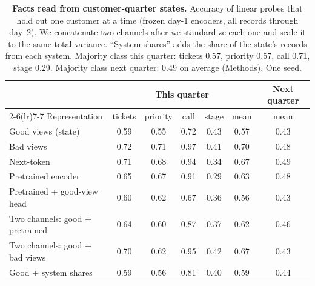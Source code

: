 \documentclass[11pt]{article}
\begin{document}
\begin{table}[h]
\centering
\small
\caption{\textbf{Facts read from customer-quarter states.} Accuracy of linear probes that hold out one customer at a time (frozen day-1 encoders, all records through day~2). We concatenate two channels after we standardize each one and scale it to the same total variance. ``System shares'' adds the share of the state's records from each system. Majority class this quarter: tickets 0.57, priority 0.57, call 0.71, stage 0.29. Majority class next quarter: 0.49 on average (Methods). One seed.}
\label{tab:twochannel}
\setlength{\tabcolsep}{4pt}\begin{tabular}{lcccccc}
\toprule
& \multicolumn{5}{c}{This quarter} & Next quarter \\
\cmidrule(lr){2-6}\cmidrule(lr){7-7}
Representation & tickets & priority & call & stage & mean & mean \\
\midrule
Good views (state) & 0.59 & 0.55 & 0.72 & 0.43 & 0.57 & 0.43 \\
Bad views & 0.72 & 0.71 & 0.97 & 0.41 & 0.70 & 0.48 \\
Next-token & 0.71 & 0.68 & 0.94 & 0.34 & 0.67 & 0.49 \\
Pretrained encoder & 0.65 & 0.67 & 0.91 & 0.29 & 0.63 & 0.48 \\
Pretrained + good-view head & 0.60 & 0.62 & 0.67 & 0.36 & 0.56 & 0.43 \\
Two channels: good + pretrained & 0.64 & 0.60 & 0.87 & 0.37 & 0.62 & 0.46 \\
Two channels: good + bad views & 0.70 & 0.62 & 0.95 & 0.42 & 0.67 & 0.43 \\
Good + system shares & 0.59 & 0.56 & 0.81 & 0.40 & 0.59 & 0.44 \\
\bottomrule
\end{tabular}
\end{table}
\end{document}
